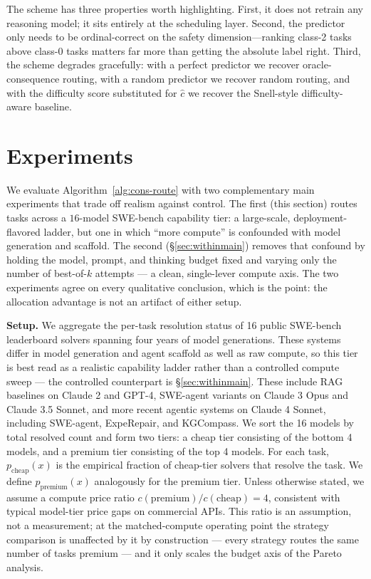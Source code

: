 \documentclass{article}
\begin{document}
The scheme has three properties worth highlighting. First, it does
not retrain any reasoning model; it sits entirely at the scheduling
layer. Second, the predictor only needs to be ordinal-correct
on the safety dimension---ranking class-2 tasks above class-0 tasks
matters far more than getting the absolute label right. Third, the
scheme degrades gracefully: with a perfect predictor we recover
oracle-consequence routing, with a random predictor we recover random
routing, and with the difficulty score substituted for $\hat{c}$ we
recover the Snell-style difficulty-aware baseline.

\section{Experiments}
\label{sec:exp}

We evaluate Algorithm~\ref{alg:cons-route} with two complementary main
experiments that trade off realism against control. The first (this
section) routes tasks across a $16$-model SWE-bench
capability tier: a large-scale, deployment-flavored ladder, but one in
which ``more compute'' is confounded with model generation and
scaffold. The second (\S\ref{sec:withinmain}) removes that confound by
holding the model, prompt, and thinking budget fixed and varying only
the number of best-of-$k$ attempts --- a clean, single-lever
compute axis. The two experiments agree on every qualitative
conclusion, which is the point: the allocation advantage is not an
artifact of either setup.

\textbf{Setup.} We aggregate the per-task resolution status of 16
public SWE-bench leaderboard solvers spanning four years of model
generations. These systems differ in model generation and agent
scaffold as well as raw compute, so this tier is best read as a
realistic capability ladder rather than a controlled compute sweep ---
the controlled counterpart is \S\ref{sec:withinmain}. These include RAG baselines on Claude 2 and GPT-4,
SWE-agent variants on Claude 3 Opus and Claude 3.5 Sonnet, and more
recent agentic systems on Claude 4 Sonnet, including SWE-agent,
ExpeRepair, and KGCompass. We sort the 16 models by total resolved
count and form two tiers: a cheap tier consisting of the bottom
4 models, and a premium tier consisting of the top 4 models.
For each task, $p_{\mathrm{cheap}}(x)$ is the empirical fraction of
cheap-tier solvers that resolve the task. We define
$p_{\mathrm{premium}}(x)$ analogously for the premium tier. Unless
otherwise stated, we assume a compute price ratio
$c(\text{premium})/c(\text{cheap}) = 4$, consistent with typical
model-tier price gaps on commercial APIs. This ratio is an
assumption, not a measurement; at the matched-compute operating
point the strategy comparison is unaffected by it by construction
--- every strategy routes the same number of tasks premium --- and
it only scales the budget axis of the Pareto analysis.
\end{document}
